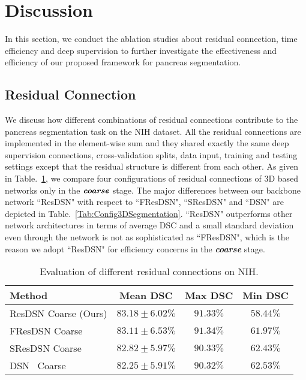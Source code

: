 \documentclass[10pt,twocolumn,letterpaper]{article}
\begin{document}
\section{Discussion}
In this section, we conduct the ablation studies about residual connection, time efficiency and deep supervision to further investigate the effectiveness and efficiency of our proposed framework for pancreas segmentation.

\subsection{Residual Connection}\label{Sec:DisResConnection}
We discuss how different combinations of residual connections contribute to the pancreas segmentation task on the NIH dataset. All the residual connections are implemented in the element-wise sum and they shared exactly the same deep supervision connections, cross-validation splits, data input, training and testing settings except that the residual structure is different from each other. As given in Table.~\ref{Tab:NIHResSegmentation}, we compare four configurations of residual connections of 3D based networks only in the $\textit{\textbf{coarse}}$ stage. The major differences between our backbone network ``ResDSN" with respect to ``FResDSN", ``SResDSN" and ``DSN" are depicted in Table.~\ref{Tab:Config3DSegmentation}. ``ResDSN" outperforms other network architectures in terms of average DSC and a small standard deviation even through the network is not as sophisticated as ``FResDSN", which is the reason we adopt ``ResDSN" for efficiency concerns in the \textit{\textbf{coarse}} stage.

\begin{table}[tb]
\footnotesize
\begin{center}
\begin{tabular}{lccc}\toprule
Method           & {Mean DSC}       		& {Max DSC}    		& {Min DSC} \\
\hline
{ResDSN Coarse (Ours)}  		& $\bm{83.18\pm{6.02}}\%$ 				& $91.33\%$       	&$58.44\%$ \\
\hline
{FResDSN Coarse} 	& $83.11\pm{6.53}\%$ 				&$91.34\%$ 			& $61.97\%$\\
{SResDSN Coarse} &$82.82\pm{5.97}\%$ 				&$90.33\%$			&$62.43\%$ \\
{DSN~\cite{dou20173d} Coarse}		&$82.25\pm{5.91}\%$ 				&$90.32\%$			&$62.53\%$ \\
\bottomrule
\end{tabular}
\end{center}
\caption{
    Evaluation of different residual connections on NIH.
}
\label{Tab:NIHResSegmentation}
\end{table}
\end{document}
